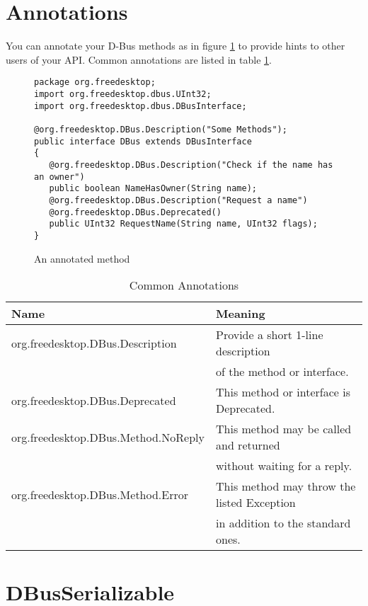 \documentclass[a4paper,12pt]{article}
\begin{document}
\section{Annotations}

You can annotate your D-Bus methods as in figure \ref{fig:annotation} to provide hints to other users of your API. Common annotations are listed in table \ref{tab:annotations}.

\begin{figure}[htb]
\begin{center}
\begin{verbatim}
package org.freedesktop;
import org.freedesktop.dbus.UInt32;
import org.freedesktop.dbus.DBusInterface;

@org.freedesktop.DBus.Description("Some Methods");
public interface DBus extends DBusInterface
{
   @org.freedesktop.DBus.Description("Check if the name has an owner")
   public boolean NameHasOwner(String name);
   @org.freedesktop.DBus.Description("Request a name")
   @org.freedesktop.DBus.Deprecated()
   public UInt32 RequestName(String name, UInt32 flags);
}
\end{verbatim}
\end{center}
\caption{An annotated method}
\label{fig:annotation}
\end{figure}


\begin{table}[htb]
\begin{tabular}{l|l}
{\bf Name} & {\bf Meaning} \\
\hline
org.freedesktop.DBus.Description & Provide a short 1-line description \\
      & of the method or interface. \\
org.freedesktop.DBus.Deprecated & This method or interface is Deprecated. \\
org.freedesktop.DBus.Method.NoReply & This method may be called and returned \\
   & without waiting for a reply. \\
org.freedesktop.DBus.Method.Error & This method may throw the listed Exception\\
   & in addition to the standard ones. \\
\end{tabular}
\caption{Common Annotations}
\label{tab:annotations}
\end{table}

\section{DBusSerializable}
\end{document}
